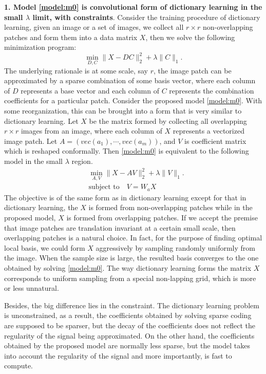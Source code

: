 \documentclass[a4paper]{article}
\begin{document}
\textbf{1. Model \eqref{model:m0} is convolutional form of dictionary learning in the small $\lambda$ limit, with constraints}. Consider the training procedure of dictionary learning, given an image or a set of images, we collect all $r\times r$ non-overlapping patches and form them into a data matrix $X$, then we solve the following minimization program:
\begin{equation}
\min_{D,C} \|X-DC\|_2^2 + \lambda\|C\|_1.
\end{equation}
The underlying rationale is at some scale, say $r$, the image patch can be approximated by a sparse combination of some basis vector, where each column of $D$ represents a base vector and each column of $C$ represents the combination coefficients for a particular patch.
Consider the proposed model \eqref{model:m0}. With some reorganization, this can be brought into a form that is very similar to dictionary learning. Let $X$ be the matrix formed by collecting all overlapping $r\times r$ images from an image, where each column of $X$ represents a vectorized image patch. Let $A=(vec(a_1),\cdots, vec(a_m))$, and $V$ is coefficient matrix which is reshaped conformally. Then \eqref{model:m0} is equivalent to the following model in the small $\lambda$ region.
\begin{equation}
\begin{aligned}
&\min_{A,V} \|X-AV\|_2^2+\lambda \|V\|_1. \\
&\textrm{subject to}\quad V=W_a X
\end{aligned}
\end{equation}
The objective is of the same form as in dictionary learning except for that in dictionary learning, the $X$ is formed from non-overlapping patches while in the proposed model,  $X$ is formed from overlapping patches. If we accept the premise that image patches are translation invariant at a certain small scale, then overlapping patches is a natural choice. In fact, for the purpose of finding optimal local basis, we could form $X$ aggressively by sampling randomly uniformly from the image. When the sample size is large, the resulted basis converges to the one obtained by solving \eqref{model:m0}. The way dictionary learning forms the matrix $X$ corresponds to uniform sampling from a special non-lapping grid, which is more or less unnatural. 

Besides, the big difference lies in the constraint. The dictionary learning problem is unconstrained, as a result, the coefficients obtained by solving sparse coding are supposed to be sparser, but the decay of the coefficients does not reflect the regularity of the signal being approximated. On the other hand, the coefficients obtained by the proposed model are normally less sparse, but the model takes into account the regularity of the signal and more importantly, is fast to compute.
\end{document}
